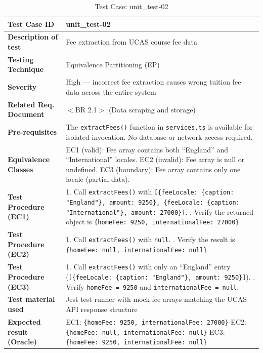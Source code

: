 \begin{table}[h!]
\centering
\caption{Test Case: unit\_test-02}
\begin{tabular}{|p{}|p{}|}
\hline
\textbf{Test Case ID} & unit\_test-02 \\ \hline
\textbf{Description of test} & Fee extraction from UCAS course fee data \\ \hline
\textbf{Testing Technique} & Equivalence Partitioning (EP) \\ \hline
\textbf{Severity} & High --- incorrect fee extraction causes wrong tuition fee data across the entire system \\ \hline
\textbf{Related Req. Document} & $<$BR 2.1$>$ (Data scraping and storage) \\ \hline
\textbf{Pre-requisites} & The \texttt{extractFees()} function in \texttt{services.ts} is available for isolated invocation. No database or network access required. \\ \hline
\textbf{Equivalence Classes} & EC1 (valid): Fee array contains both ``England'' and ``International'' locales. \newline EC2 (invalid): Fee array is null or undefined. \newline EC3 (boundary): Fee array contains only one locale (partial data). \\ \hline
\textbf{Test Procedure (EC1)} & 1. Call \texttt{extractFees()} with \texttt{[\{feeLocale: \{caption: "England"\}, amount: 9250\}, \{feeLocale: \{caption: "International"\}, amount: 27000\}]}. \newline 2. Verify the returned object is \texttt{\{homeFee: 9250, internationalFee: 27000\}}. \\ \hline
\textbf{Test Procedure (EC2)} & 1. Call \texttt{extractFees()} with \texttt{null}. \newline 2. Verify the result is \texttt{\{homeFee: null, internationalFee: null\}}. \\ \hline
\textbf{Test Procedure (EC3)} & 1. Call \texttt{extractFees()} with only an ``England'' entry (\texttt{[\{feeLocale: \{caption: "England"\}, amount: 9250\}]}). \newline 2. Verify \texttt{homeFee = 9250} and \texttt{internationalFee = null}. \\ \hline
\textbf{Test material used} & Jest test runner with mock fee arrays matching the UCAS API response structure \\ \hline
\textbf{Expected result (Oracle)} & EC1: \texttt{\{homeFee: 9250, internationalFee: 27000\}} \newline EC2: \texttt{\{homeFee: null, internationalFee: null\}} \newline EC3: \texttt{\{homeFee: 9250, internationalFee: null\}} \\ \hline

\end{tabular}
\end{table}

